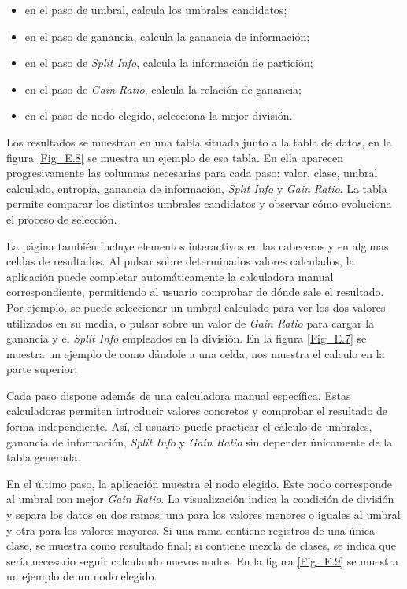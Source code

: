 \begin{itemize}
    \item en el paso de umbral, calcula los umbrales candidatos;
    \item en el paso de ganancia, calcula la ganancia de información;
    \item en el paso de \textit{Split Info}, calcula la información de partición;
    \item en el paso de \textit{Gain Ratio}, calcula la relación de ganancia;
    \item en el paso de nodo elegido, selecciona la mejor división.
\end{itemize}

Los resultados se muestran en una tabla situada junto a la tabla de datos, en la figura \ref{Fig_E.8} se muestra un ejemplo de esa tabla. En ella aparecen progresivamente las columnas necesarias para cada paso: valor, clase, umbral calculado, entropía, ganancia de información, \textit{Split Info} y \textit{Gain Ratio}. La tabla permite comparar los distintos umbrales candidatos y observar cómo evoluciona el proceso de selección.

La página también incluye elementos interactivos en las cabeceras y en algunas celdas de resultados. Al pulsar sobre determinados valores calculados, la aplicación puede completar automáticamente la calculadora manual correspondiente, permitiendo al usuario comprobar de dónde sale el resultado. Por ejemplo, se puede seleccionar un umbral calculado para ver los dos valores utilizados en su media, o pulsar sobre un valor de \textit{Gain Ratio} para cargar la ganancia y el \textit{Split Info} empleados en la división. En la figura \ref{Fig_E.7} se muestra un ejemplo de como dándole a una celda, nos muestra el calculo en la parte superior.

Cada paso dispone además de una calculadora manual específica. Estas calculadoras permiten introducir valores concretos y comprobar el resultado de forma independiente. Así, el usuario puede practicar el cálculo de umbrales, ganancia de información, \textit{Split Info} y \textit{Gain Ratio} sin depender únicamente de la tabla generada.

En el último paso, la aplicación muestra el nodo elegido. Este nodo corresponde al umbral con mejor \textit{Gain Ratio}. La visualización indica la condición de división y separa los datos en dos ramas: una para los valores menores o iguales al umbral y otra para los valores mayores. Si una rama contiene registros de una única clase, se muestra como resultado final; si contiene mezcla de clases, se indica que sería necesario seguir calculando nuevos nodos. En la figura \ref{Fig_E.9} se muestra un ejemplo de un nodo elegido.

